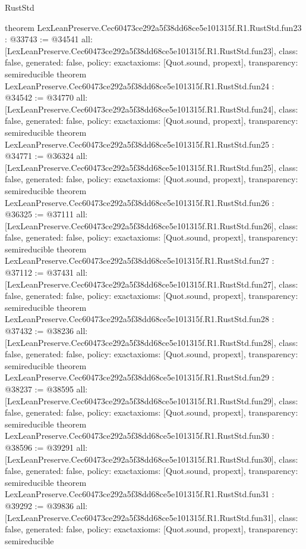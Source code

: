 \begin{lexlean}{RustStd}
\begin{coremodule}
{}
theorem LexLeanPreserve.Cec60473ce292a5f38dd68ce5e101315f.R1.RustStd.fun23 : @33743 := @34541 {
  all: [LexLeanPreserve.Cec60473ce292a5f38dd68ce5e101315f.R1.RustStd.fun23],
  class: false,
  generated: false,
  policy: exact{axioms: [Quot.sound, propext]},
  transparency: semireducible
}
theorem LexLeanPreserve.Cec60473ce292a5f38dd68ce5e101315f.R1.RustStd.fun24 : @34542 := @34770 {
  all: [LexLeanPreserve.Cec60473ce292a5f38dd68ce5e101315f.R1.RustStd.fun24],
  class: false,
  generated: false,
  policy: exact{axioms: [Quot.sound, propext]},
  transparency: semireducible
}
theorem LexLeanPreserve.Cec60473ce292a5f38dd68ce5e101315f.R1.RustStd.fun25 : @34771 := @36324 {
  all: [LexLeanPreserve.Cec60473ce292a5f38dd68ce5e101315f.R1.RustStd.fun25],
  class: false,
  generated: false,
  policy: exact{axioms: [Quot.sound, propext]},
  transparency: semireducible
}
theorem LexLeanPreserve.Cec60473ce292a5f38dd68ce5e101315f.R1.RustStd.fun26 : @36325 := @37111 {
  all: [LexLeanPreserve.Cec60473ce292a5f38dd68ce5e101315f.R1.RustStd.fun26],
  class: false,
  generated: false,
  policy: exact{axioms: [Quot.sound, propext]},
  transparency: semireducible
}
theorem LexLeanPreserve.Cec60473ce292a5f38dd68ce5e101315f.R1.RustStd.fun27 : @37112 := @37431 {
  all: [LexLeanPreserve.Cec60473ce292a5f38dd68ce5e101315f.R1.RustStd.fun27],
  class: false,
  generated: false,
  policy: exact{axioms: [Quot.sound, propext]},
  transparency: semireducible
}
theorem LexLeanPreserve.Cec60473ce292a5f38dd68ce5e101315f.R1.RustStd.fun28 : @37432 := @38236 {
  all: [LexLeanPreserve.Cec60473ce292a5f38dd68ce5e101315f.R1.RustStd.fun28],
  class: false,
  generated: false,
  policy: exact{axioms: [Quot.sound, propext]},
  transparency: semireducible
}
theorem LexLeanPreserve.Cec60473ce292a5f38dd68ce5e101315f.R1.RustStd.fun29 : @38237 := @38595 {
  all: [LexLeanPreserve.Cec60473ce292a5f38dd68ce5e101315f.R1.RustStd.fun29],
  class: false,
  generated: false,
  policy: exact{axioms: [Quot.sound, propext]},
  transparency: semireducible
}
theorem LexLeanPreserve.Cec60473ce292a5f38dd68ce5e101315f.R1.RustStd.fun30 : @38596 := @39291 {
  all: [LexLeanPreserve.Cec60473ce292a5f38dd68ce5e101315f.R1.RustStd.fun30],
  class: false,
  generated: false,
  policy: exact{axioms: [Quot.sound, propext]},
  transparency: semireducible
}
theorem LexLeanPreserve.Cec60473ce292a5f38dd68ce5e101315f.R1.RustStd.fun31 : @39292 := @39836 {
  all: [LexLeanPreserve.Cec60473ce292a5f38dd68ce5e101315f.R1.RustStd.fun31],
  class: false,
  generated: false,
  policy: exact{axioms: [Quot.sound, propext]},
  transparency: semireducible
}
\end{coremodule}
\end{lexlean}
